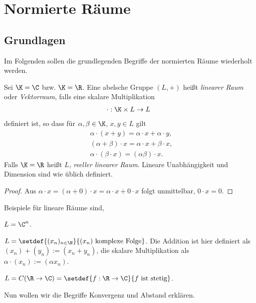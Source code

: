 \chapter{Normierte Räume}

\section{Grundlagen}
 
 Im Folgenden sollen die grundlegenden Begriffe der normierten Räume wiederholt
 werden.
 
 \begin{defn}
 \label{defn:1.1}
 Sei $\K = \C$ bzw. $\K=\R$. Eine abelsche Gruppe $(L,+)$ heißt 
 \emph{linearer Raum} oder \emph{Vektorraum}, falls eine
 skalare Multiplikation
 \begin{align*}
 \cdot : \K\times L \to L
 \end{align*}
definiert ist, so dass für $\alpha,\beta\in\K$, $x,y\in L$ gilt
\begin{align*}
&\alpha\cdot (x+y) = \alpha\cdot x + \alpha\cdot y,\\
&(\alpha+\beta)\cdot x = \alpha\cdot x + \beta \cdot x,\\
&\alpha\cdot(\beta\cdot x) = (\alpha\beta)\cdot x.
\end{align*}
Falls $\K=\R$ heißt $L$, \emph{reeller linearer Raum}. Lineare Unabhängigkeit
und Dimension sind wie üblich definiert.\fishhere
\end{defn}
\begin{proof}
Aus $\alpha\cdot x = (\alpha+0)\cdot x = \alpha\cdot x + 0\cdot x$ folgt
unmittelbar, $0\cdot x = 0$.\qedhere
\end{proof}

\begin{bsp}
\label{bps:1.2}
Beispiele für lineare Räume sind,
\begin{bspenum}
  \item $L=\C^n$.
  \item $L=\setdef{(x_n)_{n\in\N}}{(x_n)\text{ komplexe Folge}}$. Die Addition
  ist hier definiert als $(x_n)+(y_n):= (x_n+y_n)$, die skalare Multiplikation als
  $\alpha\cdot (x_n):= (\alpha x_n)$.
  \item $L=C(\R\to\C)= \setdef{f:\R\to\C}{f\text{ ist stetig}}$.\bsphere
\end{bspenum}
\end{bsp}

Nun wollen wir die Begriffe Konvergenz und Abstand erklären.

